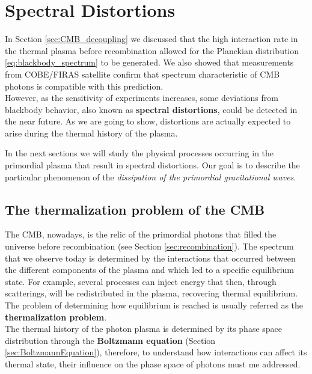 \chapter{Spectral Distortions}
\label{chap:SpectralDistortions}
In Section \ref{sec:CMB_decoupling} we discussed that the high interaction rate in the thermal plasma before recombination allowed for the Planckian distribution \eqref{eq:blackbody_spectrum} to be generated. We also showed that measurements from COBE/FIRAS satellite \cite{COBE1996} confirm that spectrum characteristic of CMB photons is compatible with this prediction.\\
However, as the sensitivity of experiments increases, some deviations from blackbody behavior, also known as \textbf{spectral distortions}, could be detected in the near future. As we are going to show, distortions are actually expected to arise during the thermal history of the plasma.

In the next sections we will study the physical processes occurring in the primordial plasma that result in spectral distortions. Our goal is to describe the particular phenomenon of the \emph{dissipation of the primordial gravitational waves}. 

\section{The thermalization problem of the CMB}\label{sec:ThermalizationProblem}
The CMB, nowadays, is the relic of the primordial photons that filled the universe before recombination (see Section \ref{sec:recombination}). The spectrum that we observe today is determined by the interactions that occurred between the different components of the plasma and which led to a specific equilibrium state. For example, several processes can inject energy that then, through scatterings, will be redistributed in the plasma, recovering thermal equilibrium. The problem of determining how equilibrium is reached is usually referred as the \textbf{thermalization problem}.\\
The thermal history of the photon plasma is determined by its phase space distribution through the \textbf{Boltzmann equation} (Section \ref{sec:BoltzmannEquation}), therefore, to understand how interactions can affect its thermal state, their influence on the phase space of photons must me addressed.  

